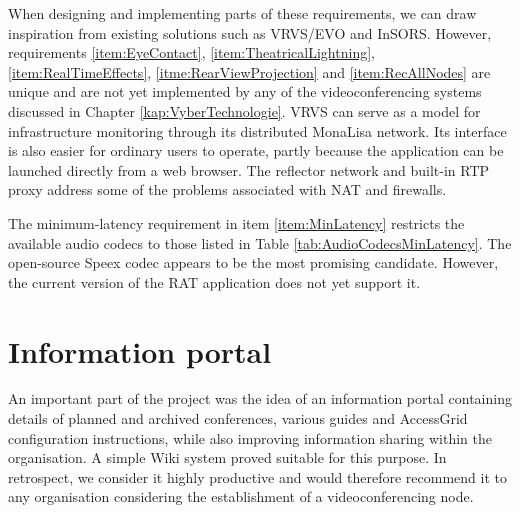 When designing and implementing parts of these requirements, we can draw inspiration from existing solutions such as VRVS/EVO and InSORS. However, requirements
\ref{item:EyeContact},
\ref{item:TheatricalLightning},
\ref{item:RealTimeEffects},
\ref{itme:RearViewProjection} and
\ref{item:RecAllNodes}
are unique and are not yet implemented by any of the videoconferencing systems discussed in Chapter \ref{kap:VyberTechnologie}.
VRVS can serve as a model for infrastructure monitoring through its distributed MonaLisa network. Its interface is also easier for ordinary users to operate, partly because the application can be launched directly from a web browser. The reflector network and built-in RTP proxy address some of the problems associated with NAT and firewalls.

The minimum-latency requirement in item \ref{item:MinLatency} restricts the available audio codecs to those listed in Table \ref{tab:AudioCodecsMinLatency}. The open-source Speex codec appears to be the most promising candidate. However, the current version of the RAT application does not yet support it.

\section{Information portal}
An important part of the project was the idea of an information portal containing details of planned and archived conferences, various guides and AccessGrid configuration instructions, while also improving information sharing within the organisation. A simple Wiki system proved suitable for this purpose. In retrospect, we consider it highly productive and would therefore recommend it to any organisation considering the establishment of a videoconferencing node.

